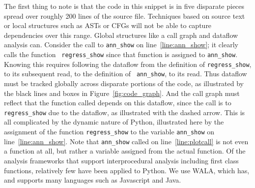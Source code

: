  The first thing to note is that the code in this snippet is in five
disparate pieces spread over roughly 200 lines of the source file.  Techniques
based on source text or local structures such as ASTs or CFGs will not
be able to capture dependencies over this range.  Global structures like a
call graph and dataflow analysis can.  Consider the call to {\tt ann\_show} on
line~\ref{line:ann_show}; it clearly calls the function {\tt
regress\_show} since that function is assigned to {\tt ann\_show}.
Knowing this requires following the dataflow from the definition of
{\tt regress\_show}, to its subsequent read, to the definition of {\tt
ann\_show}, to its read.  Thus dataflow must be tracked globally
across disparate portions of the code, as illustrated by the black
lines and boxes in Figure~\ref{fig:code_graph}.  And the call graph
must reflect that the function called depends on this dataflow, since
the call is to {\tt regress\_show} due to the dataflow, as illustrated
with the dashed arrow.  This is all complicated by the dynamic
nature of Python, illustrated here by the assignment of the function
{\tt regress\_show} to the variable {\tt ann\_show} on
line~\ref{line:ann_show}.  Note that {\tt ann\_show} called on
line~\ref{line:plotcall} is not even a function at all, but rather a variable
assigned from the actual function.  Of the analysis frameworks that
support interprocedural analysis including first class functions,
relatively few have been applied to Python.  We use WALA, which has, and supports many languages such as Javascript and Java.

